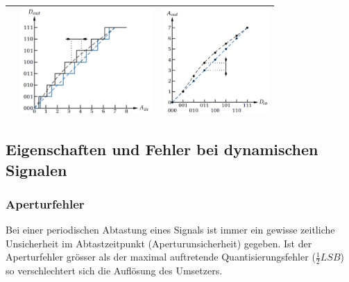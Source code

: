 \begin{tabular}{|>{\bfseries}p{}|c|c|}
	& \includegraphics[height=4cm, valign=t]{./pictures/INL_ADC.png}
	& \includegraphics[height=4cm, valign=t]{./pictures/INL_DAC.png}
	\\ \hline
\end{tabular}

\subsection{Eigenschaften und Fehler bei dynamischen Signalen}
\subsubsection{Aperturfehler} 
Bei einer periodischen Abtastung eines Signals ist immer ein gewisse zeitliche
Unsicherheit im Abtastzeitpunkt (Aperturunsicherheit) gegeben. Ist der Aperturfehler grösser als der maximal
auftretende Quantisierungsfehler ($\frac{1}{2}LSB$) so verschlechtert sich die Auflösung des Umsetzers. 


